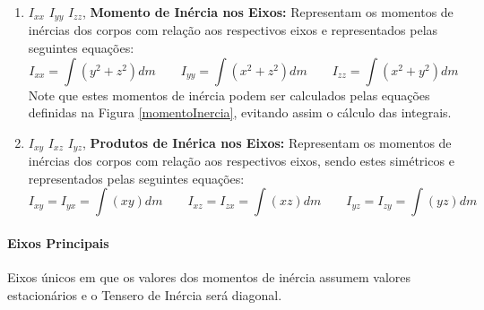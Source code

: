 \documentclass{article}
\begin{document}
                \begin{enumerate}[rightmargin = \leftmargin]
                    \item $I_{xx}$ $I_{yy}$ $I_{zz}$, \textbf{Momento de Inércia nos Eixos:} Representam os momentos de inércias dos corpos com relação aos respectivos eixos e representados pelas seguintes equações:
                        \begin{equation}
                            \boxed{I_{xx} = \int(y^2 + z^2)dm} \qquad 
                            \boxed{I_{yy} = \int(x^2 + z^2)dm} \qquad 
                            \boxed{I_{zz} = \int(x^2 + y^2)dm}
                        \end{equation}
                    Note que estes momentos de inércia podem ser calculados pelas equações definidas na Figura \ref{momentoInercia}, evitando assim o cálculo das integrais.

                    \item $I_{xy}$ $I_{xz}$ $I_{yz}$, \textbf{Produtos de Inérica nos Eixos:} Representam os momentos de inércias dos corpos com relação aos respectivos eixos, sendo estes simétricos e representados pelas seguintes equações:
                        \begin{equation}
                            \boxed{I_{xy} = I_{yx} = \int(xy)dm} \qquad 
                            \boxed{I_{xz} = I_{zx} = \int(xz)dm} \qquad 
                            \boxed{I_{yz} = I_{zy} = \int(yz)dm}
                        \end{equation}
                \end{enumerate}

            \paragraph{Eixos Principais}Eixos únicos em que os valores dos momentos de inércia assumem valores estacionários e o Tensero de Inércia será diagonal.
\end{document}
